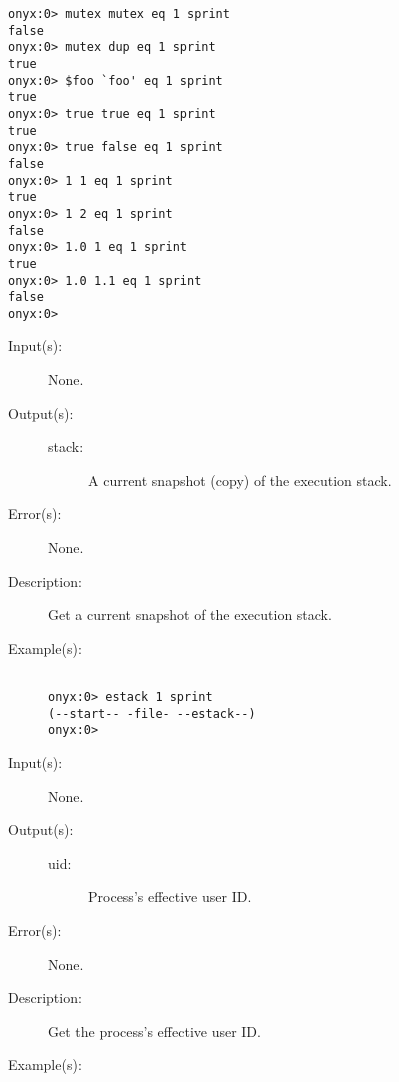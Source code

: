 \begin{description}
\begin{description}
\begin{verbatim}
onyx:0> mutex mutex eq 1 sprint
false
onyx:0> mutex dup eq 1 sprint
true
onyx:0> $foo `foo' eq 1 sprint
true
onyx:0> true true eq 1 sprint
true
onyx:0> true false eq 1 sprint
false
onyx:0> 1 1 eq 1 sprint
true
onyx:0> 1 2 eq 1 sprint
false
onyx:0> 1.0 1 eq 1 sprint
true
onyx:0> 1.0 1.1 eq 1 sprint
false
onyx:0>
		\end{verbatim}
	\end{description}
\label{systemdict:estack}
\item[{\onyxop{--}{estack}{stack}}: ]
	\begin{description}\item[]
	\item[Input(s): ] None.
	\item[Output(s): ]
		\begin{description}\item[]
		\item[stack: ]
			A current snapshot (copy) of the execution stack.
		\end{description}
	\item[Error(s): ] None.
	\item[Description: ]
		Get a current snapshot of the execution stack.
	\item[Example(s): ]\begin{verbatim}

onyx:0> estack 1 sprint
(--start-- -file- --estack--)
onyx:0>
		\end{verbatim}
	\end{description}
\label{systemdict:euid}
\item[{\onyxop{--}{euid}{uid}}: ]
	\begin{description}\item[]
	\item[Input(s): ] None.
	\item[Output(s): ]
		\begin{description}\item[]
		\item[uid: ]
			Process's effective user ID.
		\end{description}
	\item[Error(s): ] None.
	\item[Description: ]
		Get the process's effective user ID.
	\item[Example(s): ]\begin{verbatim}


\end{verbatim}
\end{description}
\end{description}
